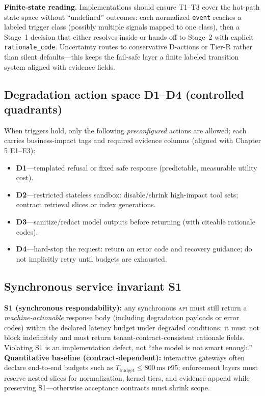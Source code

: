 \documentclass[11pt,a4paper]{report}
\begin{document}
\noindent\textbf{Finite-state reading.} Implementations should ensure T1--T3 cover the hot-path state space without ``undefined'' outcomes: each normalized \texttt{event} reaches a labeled trigger class (possibly multiple signals mapped to one class), then a Stage~1 decision that either resolves inside \SafetyKernel{} or hands off to Stage~2 with explicit \texttt{rationale\_code}. Uncertainty routes to conservative D-actions or Tier-R rather than silent defaults---this keeps the fail-safe layer a finite labeled transition system aligned with evidence fields.

\subsection{Degradation action space D1--D4 (controlled quadrants)}
When triggers hold, only the following \emph{preconfigured} actions are allowed; each carries business-impact tags and required evidence columns (aligned with Chapter 5 E1--E3):
\begin{itemize}
  \item \textbf{D1}—templated refusal or fixed safe response (predictable, measurable utility cost).
  \item \textbf{D2}—restricted stateless sandbox: disable/shrink high-impact tool sets; contract retrieval slices or index generations.
  \item \textbf{D3}—sanitize/redact model outputs before returning (with citeable rationale codes).
  \item \textbf{D4}—hard-stop the request: return an error code and recovery guidance; do not implicitly retry until budgets are exhausted.
\end{itemize}

\subsection{Synchronous service invariant S1}
\textbf{S1 (synchronous respondability):} any synchronous \textsc{api} must still return a \emph{machine-actionable} response body (including degradation payloads or error codes) within the declared latency budget under degraded conditions; it must not block indefinitely and must return tenant-contract-consistent rationale fields. Violating S1 is an implementation defect, not “the model is not smart enough.” \textbf{Quantitative baseline (contract-dependent):} interactive gateways often declare end-to-end budgets such as $T_{\mathrm{budget}} \le 800\,\mathrm{ms}$ \textsc{p95}; enforcement layers must reserve nested slices for normalization, kernel tiers, and evidence append while preserving S1---otherwise acceptance contracts must shrink scope.
\end{document}
